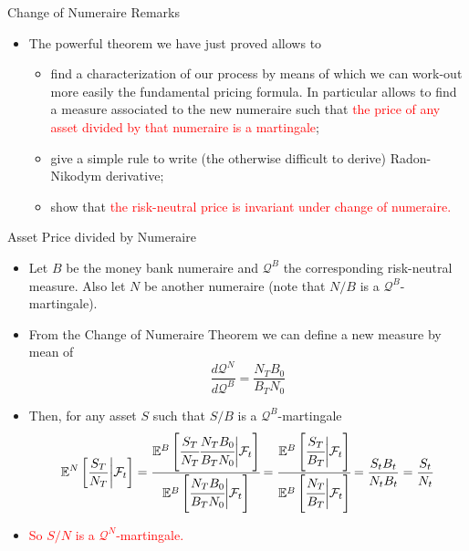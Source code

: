 \documentclass{beamer}
\begin{document}
\begin{frame}{Change of Numeraire Remarks}
  \begin{itemize}
  \item The powerful theorem we have just proved allows to
    \begin{itemize}
    \item find a characterization of our process by means of which we can work-out more easily the fundamental pricing formula. In particular allows to find a measure associated to the new numeraire such that \textcolor{red}{the price of any asset divided by that numeraire is a martingale};
    \item give a simple rule to write (the otherwise difficult to derive) Radon-Nikodym derivative;
    \item show that \textcolor{red}{the risk-neutral price is invariant under change of numeraire.}
    \end{itemize}
  \end{itemize}
\end{frame}

\begin{frame}{Asset Price divided by Numeraire}
	\begin{itemize}
 	\item<1-> Let $B$ be the money bank numeraire and $\mathcal{Q}^B$ the corresponding risk-neutral measure. Also let $N$ be another numeraire (note that $N/B$ is a $\mathcal{Q}^B$-martingale). 
	\item<2-> From the Change of Numeraire Theorem we can define a new measure by mean of
  \begin{equation*}
    \frac{d\mathcal{Q}^N}{d\mathcal{Q}^B} = \frac{N_TB_0}{B_TN_0}
  \end{equation*}
	\item<3-> Then, for any asset $S$ such that $S/B$ is a $\mathcal{Q}^B$-martingale
  \begin{equation*}
    \mathbb{E}^N\left[\frac{S_T}{N_T}\bigg|\mathcal{F}_t\right] = \cfrac{\mathbb{E}^B\left[\cfrac{S_T}{N_T}\cfrac{N_TB_0}{B_TN_0}\bigg|\mathcal{F}_t\right]}{\mathbb{E}^B\left[\cfrac{N_TB_0}{B_TN_0}\bigg|\mathcal{F}_t\right]}
    =\cfrac{\mathbb{E}^B\left[\cfrac{S_T}{B_T}\bigg|\mathcal{F}_t\right]}
    {\mathbb{E}^B\left[\cfrac{N_T}{B_T}\bigg|\mathcal{F}_t\right]}
    =\frac{S_tB_t}{N_tB_t}=\frac{S_t}{N_t}
  \end{equation*}
	\item<4-> \textcolor{red}{So $S/N$ is a $\mathcal{Q}^N$-martingale.}
	\end{itemize}
\end{frame}
\end{document}
